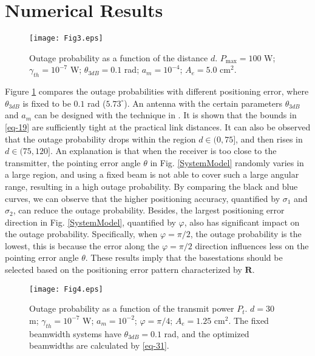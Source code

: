 \documentclass{IEEEtran}
\begin{document}
\section{Numerical Results}
\begin{figure}
  \centering
  \texttt{[image: Fig3.eps]}\\
  \caption{Outage probability as a function of the distance $d$. $P_{\max}=100$ W; $\gamma_{th}=10^{-7}$ W; $\theta_{3dB}=0.1$ rad; $a_m=10^{-4}$; {{ $A_e=5.0$ cm$^2$}}. }\label{distance}
\end{figure}
Figure \ref{distance} compares the outage probabilities with different positioning error, where $\theta_{3dB}$ is fixed to be $0.1$ rad ($5.73^\circ $). {{An antenna with the certain parameters $\theta_{3dB}$ and $a_m$ can be designed with the technique in  \cite[Chap. 3]{ModernAntennaDesign2005}.}} It is shown that the bounds in \eqref{eq-19} are sufficiently tight at the practical link distances. It can also be observed that the outage probability drops within the region $d\in(0, 75]$, and then rises in $d \in (75,120]$. An explanation is that when the receiver is too close to the transmitter, the pointing error angle $\theta$ in Fig. \ref{SystemModel} randomly varies in a large region, and using a fixed beam is not able to cover such a large angular range, resulting in a high outage probability. By comparing the black and blue curves, we can observe that the higher positioning accuracy, quantified by $\sigma_1$ and $\sigma_2$, can reduce the outage probability. Besides, the largest positioning error direction in Fig. \ref{SystemModel}, quantified by $\varphi$, also has significant impact on the outage probability. Specifically, when $\varphi=\pi/2$, the outage probability is the lowest, this is because the error along the $\varphi=\pi/2$ direction influences less on the pointing error angle $\theta$. These results imply that the basestations should be selected based on the positioning error pattern characterized by $\textbf{R}$.


\begin{figure}
  \centering
  \texttt{[image: Fig4.eps]}\\
  \caption{Outage probability as a function of the transmit power $P_t$. $d=30$ m; $\gamma_{th}=10^{-7}$ W; $a_m=10^{-2}$; $\varphi=\pi/4$; {{ $A_e=1.25$ cm$^2$}}. The fixed beamwidth systems have $\theta_{3dB}=0.1$ rad, and the optimized beamwidths are calculated by \eqref{eq-31}.}\label{Pt}
\end{figure}
\end{document}
